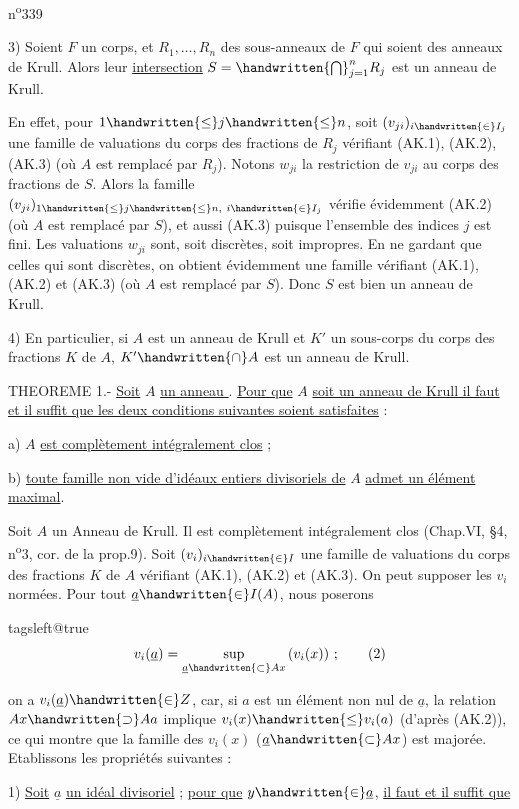 

n\textsuperscript{o}339

3) Soient $F$ un corps, et $R_1,\ldots,R_n$ des sous-anneaux de $F$ qui soient des anneaux de Krull. Alors leur \uline{intersection} $S=\handwritten{\bigcap}_{j=1}^{n}R_j$ est un anneau de Krull.

En effet, pour $1\handwritten{\leq}j\handwritten{\leq}n$, soit $(v_{ji})_{i\handwritten{\in}I_j}$ une famille de valuations du corps des fractions de $R_j$ vérifiant (AK.1), (AK.2), (AK.3) (où $A$ est remplacé par $R_j$). Notons $w_{ji}$ la restriction de $v_{ji}$ au corps des fractions de $S$. Alors la famille $(v_{ji})_{1\handwritten{\leq}j\handwritten{\leq}n,\ i\handwritten{\in}I_j}$ vérifie évidemment (AK.2) (où $A$ est remplacé par $S$), et aussi (AK.3) puisque l'ensemble des indices $j$ est fini. Les valuations $w_{ji}$ sont, soit discrètes, soit impropres. En ne gardant que celles qui sont discrètes, on obtient évidemment une famille vérifiant (AK.1), (AK.2) et (AK.3) (où $A$ est remplacé par $S$). Donc $S$ est bien un anneau de Krull.

4) En particulier, si $A$ est un anneau de Krull et $K'$ un sous-corps du corps des fractions $K$ de $A$, $K'\handwritten{\cap}A$ est un anneau de Krull.

THEOREME 1.- \uline{Soit} $A$ \uline{un anneau }. \uline{Pour que} $A$ \uline{soit un anneau de Krull il faut et il suffit que les deux conditions suivantes soient satisfaites} :

a) $A$ \uline{est complètement intégralement clos} ;

b) \uline{toute famille non vide d'idéaux entiers divisoriels de} $A$ \uline{admet un élément maximal}.

Soit $A$ un Anneau de Krull. Il est complètement intégralement clos (Chap.VI, \S4, n\textsuperscript{o}3, cor. de la prop.9). Soit $(v_i)_{i\handwritten{\in}I}$ une famille de valuations du corps des fractions $K$ de $A$ vérifiant (AK.1), (AK.2) et (AK.3). On peut supposer les $v_i$ normées. Pour tout $\underline a\handwritten{\in}I(A)$, nous poserons

\begingroup\csname tagsleft@true\endcsname
\[ v_i(\underline a)=\sup_{\underline a\handwritten{\subset}Ax}\,(v_i(x))\ ;\tag*{(2)} \]
\endgroup

on a $v_i(\underline a)\handwritten{\in}Z$, car, si $a$ est un élément non nul de $\underline a$, la relation $Ax\handwritten{\supset}Aa$ implique $v_i(x)\handwritten{\leq}v_i(a)$ (d'après (AK.2)), ce qui montre que la famille des $v_i(x)$ ($\underline a\handwritten{\subset}Ax$) est majorée. Etablissons les propriétés suivantes :

1) \uline{Soit} $\underline a$ \uline{un idéal divisoriel} ; \uline{pour que} $y\handwritten{\in}\underline a$, \uline{il faut et il suffit que}

